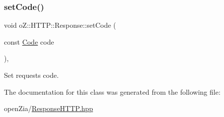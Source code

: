 \subsubsection{\texorpdfstring{setCode()}{setCode()}}
{\footnotesize\ttfamily void o\+Z\+::\+H\+T\+T\+P\+::\+Response\+::set\+Code (\begin{DoxyParamCaption}\item[{const \mbox{\hyperlink{namespaceo_z_1_1_h_t_t_p_acd43703151305f79b1e2f42e98ee8199}{Code}}}]{code }\end{DoxyParamCaption})\hspace{0.3cm}{\ttfamily [inline]}, {\ttfamily [noexcept]}}



Set request\textquotesingle{}s code. 



The documentation for this class was generated from the following file\+:\begin{DoxyCompactItemize}
\item 
open\+Zia/\mbox{\hyperlink{_response_h_t_t_p_8hpp}{Response\+H\+T\+T\+P.\+hpp}}\end{DoxyCompactItemize}

